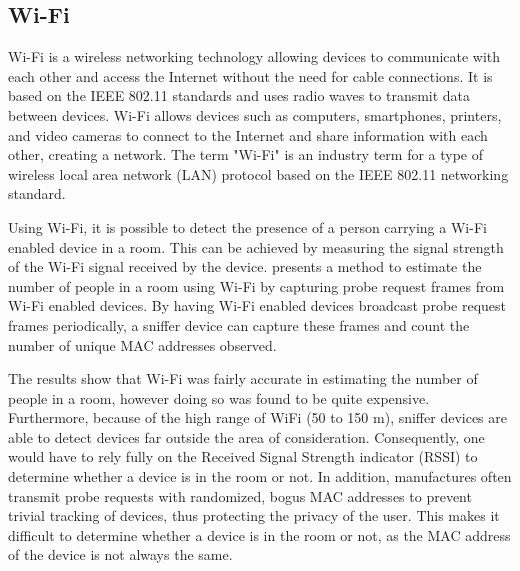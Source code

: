 \subsection{Wi-Fi} \label{sec:wi-fi}
Wi-Fi is a wireless networking technology allowing devices to communicate with each other and access the Internet without the need for cable connections.
It is based on the IEEE 802.11 standards and uses radio waves to transmit data between devices.
Wi-Fi allows devices such as computers, smartphones, printers, and video cameras to connect to the Internet and share information with each other, creating a network.
The term "Wi-Fi" is an industry term for a type of wireless local area network (LAN) protocol based on the IEEE 802.11 networking standard.\cite{WiFiAllianceDiscover,CiscoWhatIsWiFi}

Using Wi-Fi, it is possible to detect the presence of a person carrying a Wi-Fi enabled device in a room.
This can be achieved by measuring the signal strength of the Wi-Fi signal received by the device.
\citeauthor{longoAccurateOccupancyEstimation2019} presents a method to estimate the number of people in a room using Wi-Fi by capturing probe request frames from Wi-Fi enabled devices.
By having Wi-Fi enabled devices broadcast probe request frames periodically, a sniffer device can capture these frames and count the number of unique MAC addresses observed. \cite{longoAccurateOccupancyEstimation2019}

The results show that Wi-Fi was fairly accurate in estimating the number of people in a room, however doing so was found to be quite expensive.
Furthermore, because of the high range of WiFi (50 to 150 m), sniffer devices are able to detect devices far outside the area of consideration.
Consequently, one would have to rely fully on the Received Signal Strength indicator (RSSI) to determine whether a device is in the room or not.
In addition, manufactures often transmit probe requests with randomized, bogus MAC addresses to prevent trivial tracking of devices, thus protecting the privacy of the user.
This makes it difficult to determine whether a device is in the room or not, as the MAC address of the device is not always the same.\cite{longoAccurateOccupancyEstimation2019}